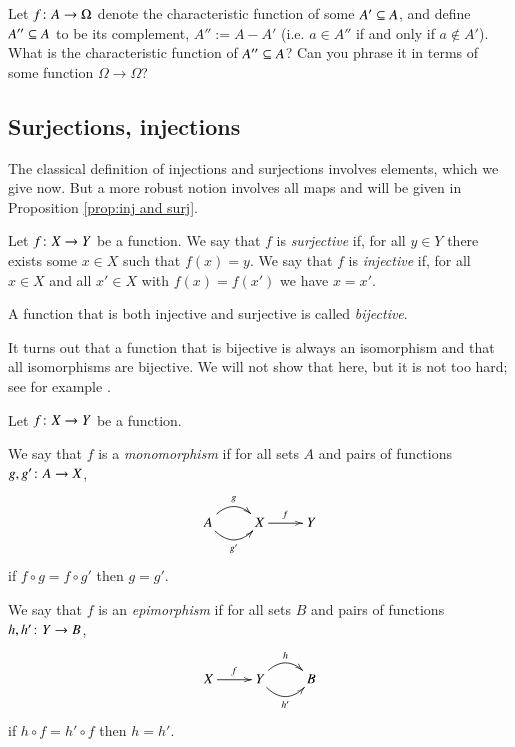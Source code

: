 \begin{exercise}
Let $f\taking A\to\Omega$ denote the characteristic function of some $A'\ss A$, and define $A''\ss A$ to be its complement, $A'':=A-A'$ (i.e. $a\in A''$ if and only if $a\not\in A'$). 
\sexc What is the characteristic function of $A''\ss A$? 
\next Can you phrase it in terms of some function $\Omega\to\Omega$?
\endsexc
\end{exercise}


\subsection{Surjections, injections}

The classical definition of injections and surjections involves elements, which we give now. But a more robust notion involves all maps and will be given in Proposition \ref{prop:inj and surj}.

\begin{definition}\label{def:inj,surj,bij}

Let $f\taking X\to Y$ be a function. We say that $f$ is {\em surjective} if, for all $y\in Y$ there exists some $x\in X$ such that $f(x)=y$. We say that $f$ is {\em injective} if, for all $x\in X$ and all $x'\in X$ with $f(x)=f(x')$ we have $x=x'$.

A function that is both injective and surjective is called {\em bijective}.

\end{definition}

\begin{remark}

It turns out that a function that is bijective is always an isomorphism and that all isomorphisms are bijective. We will not show that here, but it is not too hard; see for example \cite[Theorem 5.4]{Big}.

\end{remark}

\begin{definition}\label{def:mono, epi in set}

Let $f\taking X\to Y$ be a function. 

We say that $f$ is a {\em monomorphism} if for all sets $A$ and pairs of functions $g,g'\taking A\to X$,
$$
\xymatrix{A\ar@/^1pc/[r]^g\ar@/_1pc/[r]_{g'}&X\ar[r]^f&Y}
$$
if $f\circ g=f\circ g'$ then $g=g'$.

We say that $f$ is an {\em epimorphism} if for all sets $B$ and pairs of functions $h,h'\taking Y\to B$, 
$$
\xymatrix{X\ar[r]^f&Y\ar@/^1pc/[r]^h\ar@/_1pc/[r]_{h'}&B}
$$
if $h\circ f=h'\circ f$ then $h=h'$.

\end{definition}

